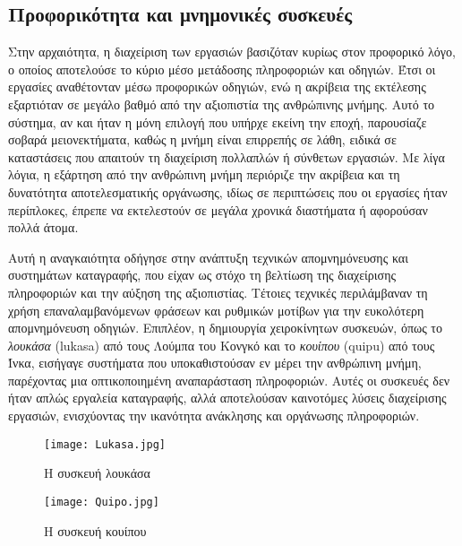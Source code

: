 
        \subsection{Προφορικότητα και μνημονικές συσκευές}
            Στην αρχαιότητα, η διαχείριση των εργασιών βασιζόταν κυρίως στον προφορικό λόγο, ο οποίος αποτελούσε το κύριο μέσο μετάδοσης πληροφοριών και οδηγιών. Έτσι οι εργασίες αναθέτονταν μέσω προφορικών οδηγιών, ενώ η ακρίβεια της εκτέλεσης εξαρτιόταν σε μεγάλο βαθμό από την αξιοπιστία της ανθρώπινης μνήμης. Αυτό το σύστημα, αν και ήταν η μόνη επιλογή που υπήρχε εκείνη την εποχή, παρουσίαζε σοβαρά μειονεκτήματα, καθώς η μνήμη είναι επιρρεπής σε λάθη, ειδικά σε καταστάσεις που απαιτούν τη διαχείριση πολλαπλών ή σύνθετων εργασιών. Με λίγα λόγια, η εξάρτηση από την ανθρώπινη μνήμη περιόριζε την ακρίβεια και τη δυνατότητα αποτελεσματικής οργάνωσης, ιδίως σε περιπτώσεις που οι εργασίες ήταν περίπλοκες, έπρεπε να εκτελεστούν σε μεγάλα χρονικά διαστήματα ή αφορούσαν πολλά άτομα. \cite{Goody2013}

            Αυτή η αναγκαιότητα οδήγησε στην ανάπτυξη τεχνικών απομνημόνευσης και συστημάτων καταγραφής, που είχαν ως στόχο τη βελτίωση της διαχείρισης πληροφοριών και την αύξηση της αξιοπιστίας. Τέτοιες τεχνικές περιλάμβαναν τη χρήση επαναλαμβανόμενων φράσεων και ρυθμικών μοτίβων για την ευκολότερη απομνημόνευση οδηγιών. Επιπλέον, η δημιουργία χειροκίνητων συσκευών, όπως το \textit{λουκάσα} (lukasa) από τους Λούμπα του Κονγκό και το \textit{κουίπου} (quipu) από τους Ίνκα, εισήγαγε συστήματα που υποκαθιστούσαν εν μέρει την ανθρώπινη μνήμη, παρέχοντας μια οπτικοποιημένη αναπαράσταση πληροφοριών. Αυτές οι συσκευές δεν ήταν απλώς εργαλεία καταγραφής, αλλά αποτελούσαν καινοτόμες λύσεις διαχείρισης εργασιών, ενισχύοντας την ικανότητα ανάκλησης και οργάνωσης πληροφοριών.

            \begin{figure}[h!] \noindent \centering
                \texttt{[image: Lukasa.jpg]}
                \caption{Η συσκευή λουκάσα}
            \end{figure}

            \begin{figure}[h!] \noindent \centering
                \texttt{[image: Quipo.jpg]}
                \caption{Η συσκευή κουίπου}
            \end{figure}

